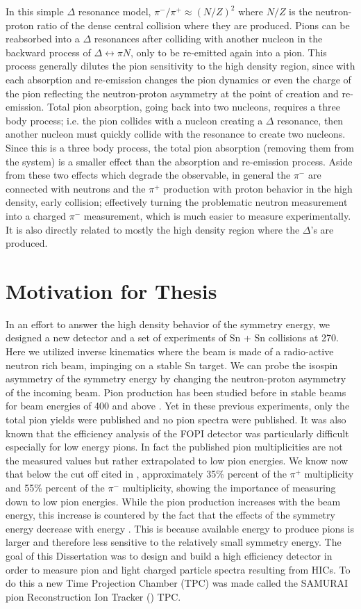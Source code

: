 In this simple $\Delta$ resonance model, $\pi^-/\pi^+ \approx (N/Z)^2$ where $N/Z$ is the neutron-proton ratio of the dense central collision where they are produced. Pions can be reabsorbed into a $\Delta$ resonances after colliding with another nucleon in the backward process of $\Delta \leftrightarrow \pi N$, only to be re-emitted again into a pion. This process generally dilutes the pion sensitivity to the high density region, since with each absorption and re-emission changes the pion dynamics or even the charge of the pion reflecting the neutron-proton asymmetry at the point of creation and re-emission. Total pion absorption, going back into two nucleons, requires a three body process; i.e. the pion collides with a nucleon creating a $\Delta$ resonance, then another nucleon must quickly collide with the resonance to create two nucleons. Since this is a three body process, the total pion absorption (removing them from the system) is a smaller effect than the absorption and re-emission process. Aside from these two effects which degrade the observable, in general the $\pi^-$ are connected with neutrons and the $\pi^+$ production with proton behavior in the high density, early collision; effectively turning the problematic neutron measurement into a charged $\pi^-$ measurement, which is much easier to measure experimentally. It is also directly related to mostly the high density region where the $\Delta$'s are produced.  

\section{Motivation for Thesis}
In an effort to answer the high density behavior of the symmetry energy, we designed a new detector and a set of experiments of Sn + Sn collisions at \SI{270}{\MeVA}. Here we utilized inverse kinematics where the beam is made of a radio-active neutron rich beam, impinging on a stable Sn target. We can probe the isospin asymmetry of the symmetry energy by changing the neutron-proton asymmetry of the incoming beam. Pion production has been studied before in stable beams for beam energies of \SI{400}{\MeVA} and above \cite{fopi}. Yet in these previous experiments, only the total pion yields were published and no pion spectra were published. It was also known that the efficiency analysis of the FOPI detector was particularly difficult especially for low energy pions. In fact the published pion multiplicities are not the measured values but rather extrapolated to low pion energies. We know now that below the cut off cited in \cite{fopi}, approximately 35\% percent of the $\pi^+$ multiplicity and 55\% percent of the $\pi^-$ multiplicity, showing the importance of measuring down to low pion energies. While the pion production increases with the beam energy, this increase is countered by the fact that the effects of the symmetry energy decrease with energy \cite{fopi}. This is because available energy to produce pions is larger and therefore less sensitive to the relatively small symmetry energy.  The goal of this Dissertation was to design and build a high efficiency detector in order to measure pion and light charged particle spectra resulting from HICs. To do this a new Time Projection Chamber (TPC) was made called the SAMURAI pion Reconstruction Ion Tracker (\spirit) TPC.
